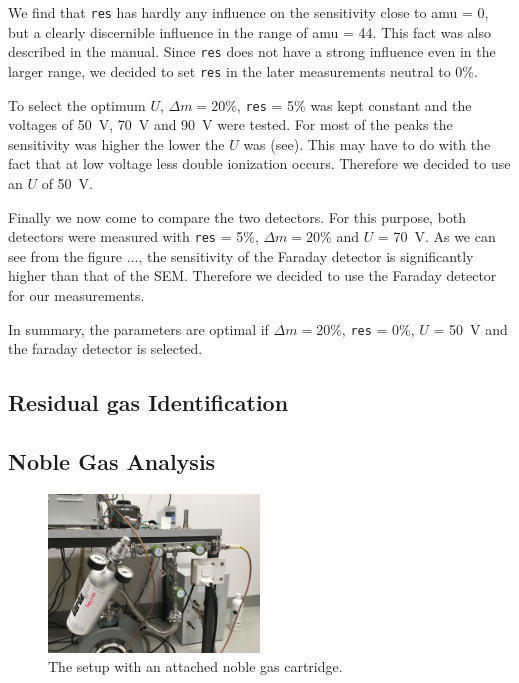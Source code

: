     We find that \texttt{res} has hardly any influence on the sensitivity close to amu = 0, but a clearly discernible influence in the range of amu = 44. This fact was also described in the manual. Since \texttt{res} does not have a strong influence even in the larger range, we decided to set \texttt{res} in the later measurements neutral to 0\%. 
    
    To select the optimum $U$, $\Delta m = 20 \%$, \texttt{res} = 5\% was kept constant and the voltages of 50~V, 70~V and 90~V were tested. For most of the peaks the sensitivity was higher the lower the $U$ was (see). This may have to do with the fact that at low voltage less double ionization occurs. Therefore we decided to use an $U$ of 50~V.  
    
    Finally we now come to compare the two detectors. For this purpose, both detectors were measured with \texttt{res} = 5\%, $\Delta m = 20\%$ and $U$ = 70~V. As we can see from the figure ..., the sensitivity of the Faraday detector is significantly higher than that of the SEM. Therefore we decided to use the Faraday detector for our measurements. 
    
    In summary, the parameters are optimal if $\Delta m = 20\%$, \texttt{res} = 0\%, $U$ = 50~V and the faraday detector is selected. 
    
    \newpage
    \subsection{Residual gas Identification}
    \subsection{Noble Gas Analysis}
    \begin{figure}[h!]
    \centering
    \includegraphics[width=0.5\textwidth]{Report/pictures/cartridge.JPG}
    \caption{The setup with an attached noble gas cartridge.}
    \label{fig:noblegas}
    \end{figure}
    
